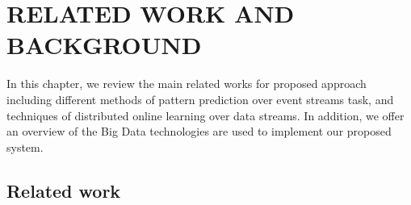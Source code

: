 
\chapter{RELATED WORK AND BACKGROUND}
\label{chap:realred_work}

\par In this chapter, we review the main related works for proposed approach including different methods of pattern prediction over event streams task, and techniques of distributed online learning over data streams. In addition, we offer an overview of the Big Data technologies are used to implement our proposed system.  
\section{Related work}





